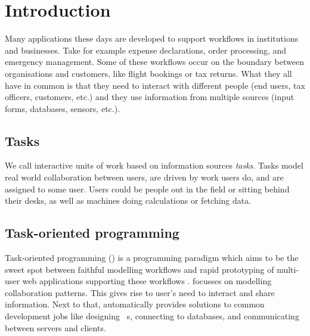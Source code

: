


\section{Introduction}


Many applications these days are developed to support workflows in institutions and businesses.
Take for example expense declarations, order processing, and emergency management.
Some of these workflows occur on the boundary between organisations and customers,
like flight bookings or tax returns.
What they all have in common is
that they need to interact with different people (end users, tax officers, customers, etc.)
and they use information from multiple sources (input forms, databases, sensors, etc.).

\subsection{Tasks}

We call interactive units of work based on information sources \emph{tasks}.
Tasks model real world collaboration between users,
are driven by work users do,
and are assigned to some user.
Users could be people out in the field or sitting behind their desks,
as well as machines doing calculations or fetching data.



\subsection{Task-oriented programming}
Task-oriented programming (\TOP) is a programming paradigm which aims to be the sweet spot between faithful modelling workflows
and rapid prototyping of multi-user web applications supporting these workflows \cite{conf/ppdp/PlasmeijerLMAK12}.
\TOP focusses on modelling collaboration patterns.
This gives rise to user's need to interact and share information.
Next to that, \TOP automatically provides solutions to common development jobs like designing \GUI\ s, connecting to databases, and communicating between servers and clients.

